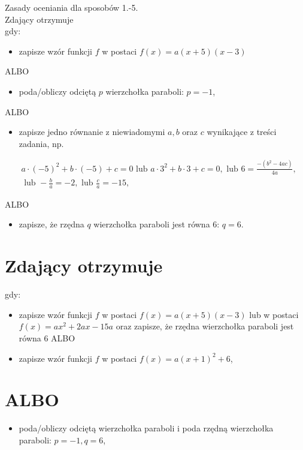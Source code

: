 \documentclass[10pt]{article}
\begin{document}
Zasady oceniania dla sposobów 1.-5.\\
Zdający otrzymuje\\
gdy:

\begin{itemize}
  \item zapisze wzór funkcji $f$ w postaci $f(x)=a(x+5)(x-3)$
\end{itemize}

ALBO

\begin{itemize}
  \item poda/obliczy odciętą $p$ wierzchołka paraboli: $p=-1$,
\end{itemize}

ALBO

\begin{itemize}
  \item zapisze jedno równanie z niewiadomymi $a, b$ oraz $c$ wynikające z treści zadania, np.
\end{itemize}

$$
\begin{aligned}
& a \cdot(-5)^{2}+b \cdot(-5)+c=0 \text { lub } a \cdot 3^{2}+b \cdot 3+c=0, \text { lub } 6=\frac{-\left(b^{2}-4 a c\right)}{4 a}, \\
& \text { lub }-\frac{b}{a}=-2, \text { lub } \frac{c}{a}=-15,
\end{aligned}
$$

ALBO

\begin{itemize}
  \item zapisze, że rzędna $q$ wierzchołka paraboli jest równa 6: $q=6$.
\end{itemize}

\section*{Zdający otrzymuje}
gdy:

\begin{itemize}
  \item zapisze wzór funkcji $f$ w postaci $f(x)=a(x+5)(x-3)$ lub w postaci $f(x)=a x^{2}+2 a x-15 a$ oraz zapisze, że rzędna wierzchołka paraboli jest równa 6 ALBO
  \item zapisze wzór funkcji $f$ w postaci $f(x)=a(x+1)^{2}+6$,
\end{itemize}

\section*{ALBO}
\begin{itemize}
  \item poda/obliczy odciętą wierzchołka paraboli i poda rzędną wierzchołka paraboli: $p=-1, q=6$,
\end{itemize}
\end{document}

